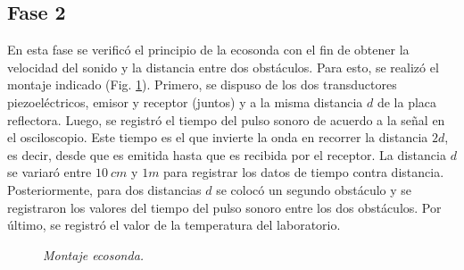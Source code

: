 \documentclass[spanish,notitlepage,letterpaper, 12pt]{article}
\begin{document}
\subsection{Fase 2}
En esta fase se verificó el principio de la ecosonda con el fin de obtener la
velocidad del sonido y la distancia entre dos obstáculos. Para esto, se realizó el montaje
indicado (Fig. \ref{fig:ecosound}). Primero, se dispuso de los dos transductores piezoeléctricos,
emisor y receptor (juntos) y a la misma distancia $d$ de la placa reflectora. Luego, se registró el tiempo del pulso sonoro de acuerdo
a la señal en el osciloscopio. Este tiempo es el que invierte la onda en recorrer
la distancia $2d$, es decir, desde que es emitida hasta que es recibida por el receptor. La
distancia $d$ se variaró entre $10\ cm$ y $1m$ para registrar los datos de tiempo contra distancia. Posteriormente, para
dos distancias $d$ se colocó un segundo obstáculo y se registraron los valores del tiempo del
pulso sonoro entre los dos obstáculos. Por último, se registró el valor de la
temperatura del laboratorio.
\shorthandoff{>}
\begin{figure}[!ht]
    \centering
    \caption{\textit{Montaje ecosonda.}}
    \label{fig:ecosound}
\end{figure}
\shorthandon{>}
\end{document}
